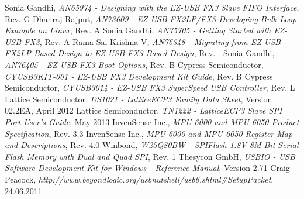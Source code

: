 \documentclass[a4paper,12pt]{report}
\begin{document}
\begin{thebibliography}{99}
 Sonia Gandhi, \emph{AN65974 - Designing with the EZ-USB FX3 Slave FIFO Interface}, Rev. G
 Dhanraj Rajput, \emph{AN73609 - EZ-USB FX2LP/FX3 Developing Bulk-Loop Example on Linux}, Rev. A
 Sonia Gandhi, \emph{AN75705 - Getting Started with EZ-USB FX3}, Rev. A
 Rama Sai Krishna V, \emph{AN76348 - Migrating from EZ-USB FX2LP Based Design to EZ-USB FX3 Based Design}, Rev. -
 Sonia Gandhi, \emph{AN76405 - EZ-USB FX3 Boot Options}, Rev. B
 Cypress Semiconductor, \emph{CYUSB3KIT-001 - EZ-USB FX3 Development Kit Guide}, Rev. B
 Cypress Semiconductor, \emph{CYUSB3014 - EZ-USB FX3 SuperSpeed USB Controller}, Rev. L
 Lattice Semiconductor, \emph{DS1021 - LatticeECP3 Family Data Sheet}, Version 02.2EA, April 2012
 Lattice Semiconductor, \emph{TN1222 - LatticeECP3 Slave SPI Port User's Guide}, May 2013
 InvenSense Inc., \emph{MPU-6000 and MPU-6050 Product Specification}, Rev. 3.3
 InvenSense Inc., \emph{MPU-6000 and MPU-6050 Register Map and Descriptions}, Rev. 4.0
 Winbond, \emph{W25Q80BW - SPIFlash 1.8V 8M-Bit Serial Flash Memory with Dual and Quad SPI}, Rev. 1
 Thesycon GmbH, \emph{USBIO - USB Software Development Kit for Windows - Reference Manual}, Version 2.71
 Craig Peacock, \emph{http://www.beyondlogic.org/usbnutshell/usb6.shtml\#SetupPacket}, 24.06.2011
\end{thebibliography}
\end{document}
